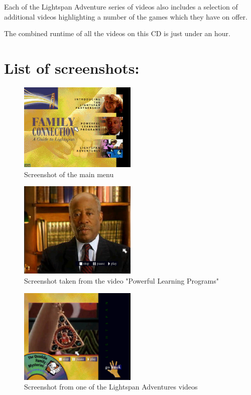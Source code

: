 Each of the Lightspan Adventure series of videos also includes a selection of additional videos highlighting a number of the games which they have on offer.

The combined runtime of all the videos on this CD is just under an hour.

\newpage

\section{List of screenshots:}

\begin{figure}[H]
    \centering
    \includegraphics[width=0.5\textwidth]{"./Games/FamilyConnection/Images/FamilyConnectionAGuidetoLightspanMainMenu.jpg"}
    \caption{Screenshot of the main menu}
\end{figure}

\begin{figure}[H]
    \centering
    \includegraphics[width=0.5\textwidth]{"./Games/FamilyConnection/Images/FamilyConnectionAGuidetoLightspanScreenshot1.png"}
    \caption{Screenshot taken from the video "Powerful Learning Programs"}
\end{figure}

\begin{figure}[H]
    \centering
    \includegraphics[width=0.5\textwidth]{"./Games/FamilyConnection/Images/FamilyConnectionAGuidetoLightspanScreenshot2.png"}
    \caption{Screenshot from one of the Lightspan Adventures videos}
\end{figure}

